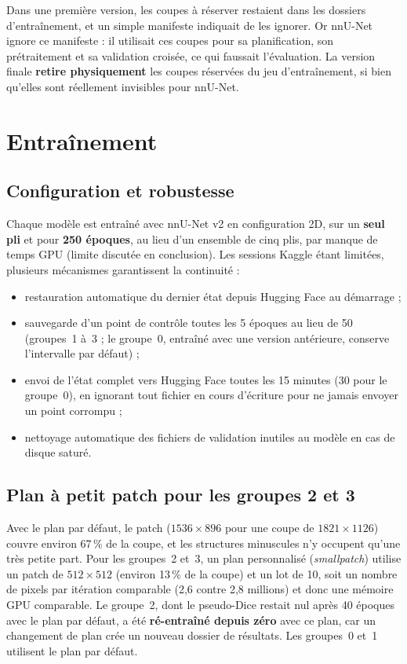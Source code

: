 \documentclass[12pt,a4paper]{report}
\begin{document}
Dans une première version, les coupes à réserver restaient dans les dossiers d'entraînement, et un simple manifeste indiquait de les ignorer. Or nnU-Net ignore ce manifeste : il utilisait ces coupes pour sa planification, son prétraitement et sa validation croisée, ce qui faussait l'évaluation. La version finale \textbf{retire physiquement} les coupes réservées du jeu d'entraînement, si bien qu'elles sont réellement invisibles pour nnU-Net.

\section{Entraînement}

\subsection{Configuration et robustesse}

Chaque modèle est entraîné avec nnU-Net v2 en configuration 2D, sur un \textbf{seul pli} et pour \textbf{250 époques}, au lieu d'un ensemble de cinq plis, par manque de temps GPU (limite discutée en conclusion). Les sessions Kaggle étant limitées, plusieurs mécanismes garantissent la continuité :
\begin{itemize}
    \item restauration automatique du dernier état depuis Hugging Face au démarrage ;
    \item sauvegarde d'un point de contrôle toutes les 5 époques au lieu de 50 (groupes~1 à~3 ; le groupe~0, entraîné avec une version antérieure, conserve l'intervalle par défaut) ;
    \item envoi de l'état complet vers Hugging Face toutes les 15 minutes (30 pour le groupe~0), en ignorant tout fichier en cours d'écriture pour ne jamais envoyer un point corrompu ;
    \item nettoyage automatique des fichiers de validation inutiles au modèle en cas de disque saturé.
\end{itemize}

\subsection{Plan à petit patch pour les groupes 2 et 3}

Avec le plan par défaut, le patch ($1536\times896$ pour une coupe de $1821\times1126$) couvre environ 67\,\% de la coupe, et les structures minuscules n'y occupent qu'une très petite part. Pour les groupes~2 et~3, un plan personnalisé (\textit{smallpatch}) utilise un patch de $512\times512$ (environ 13\,\% de la coupe) et un lot de 10, soit un nombre de pixels par itération comparable (2,6 contre 2,8 millions) et donc une mémoire GPU comparable. Le groupe~2, dont le pseudo-Dice restait nul après 40 époques avec le plan par défaut, a été \textbf{ré-entraîné depuis zéro} avec ce plan, car un changement de plan crée un nouveau dossier de résultats. Les groupes~0 et~1 utilisent le plan par défaut.
\end{document}
